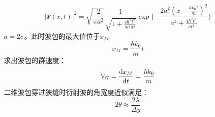 \begin{multicols}{2}
\begin{equation}
    |\Psi(x,t)|^2=\sqrt{\frac{2}{\pi a^2}}\frac{1}{\sqrt{1+\frac{4\hbar^2t^2}{m^2a^4}}}\exp\{-\frac{2a^2(x-\frac{\hbar k_0t}{m})^2}{a^4+\frac{4\hbar^2t^2}{m^2}}\}
\end{equation}
$a=2\sigma$。此时波包的最大值位于$x_M$:
\begin{equation}
    x_M=\frac{\hbar k_0}{m}t
\end{equation}
求出波包的群速度：
\begin{equation}
    V_G=\dv{x_M}{t}=\frac{\hbar k_0}{m}
\end{equation}
二维波包穿过狭缝时衍射波的角宽度近似满足：
\begin{equation}
    2\theta\approx\frac{2\lambda}{\Delta y}
\end{equation}
\end{multicols}
